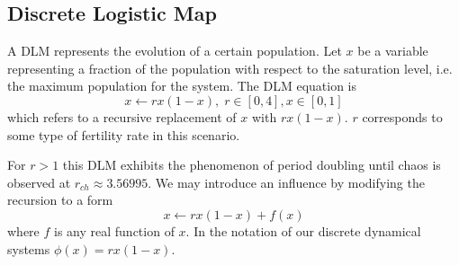 \subsection{Discrete Logistic Map}


A DLM represents the evolution of a certain population. Let $x$ be a variable representing a fraction of the population with respect to the saturation level, i.e. the maximum population for the system. The DLM equation is 
\begin{equation}
    x\leftarrow rx(1-x),\;r\in [0,4], x\in [0,1]
\end{equation}
which refers to a recursive replacement of $x$ with $rx(1-x)$. $r$ corresponds to some type of fertility rate in this scenario. 


For $r > 1$ this DLM exhibits the phenomenon of period doubling until chaos is observed at $r_{ch} \approx 3.56995$. We may introduce an influence by modifying the recursion to a form
\begin{equation}
    x\leftarrow rx(1-x)+f(x)
\end{equation}
where $f$ is any real function of $x$. In the notation of our discrete dynamical systems $\phi(x) = rx(1-x)$. 
